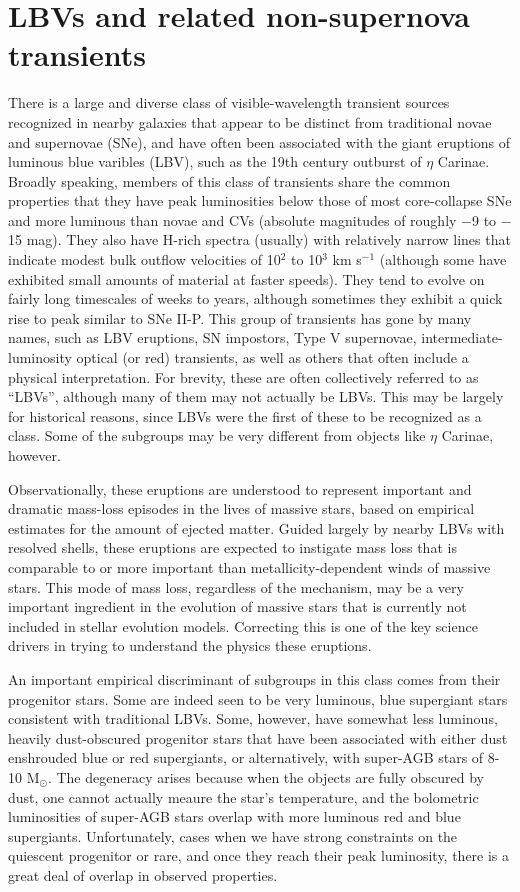 
\section{LBVs and related non-supernova transients}

There is a large and diverse class of visible-wavelength transient
sources recognized in nearby galaxies that appear to be distinct from
traditional novae and supernovae (SNe), and have often been associated with
the giant eruptions of luminous blue varibles (LBV), such as the 19th
century outburst of $\eta$ Carinae.  Broadly speaking, members of this
class of transients share the common properties that they have peak
luminosities below those of most core-collapse SNe and more luminous
than novae and CVs (absolute magnitudes of roughly $-$9 to $-$15 mag).
They also have H-rich spectra (usually) with relatively narrow lines
that indicate modest bulk outflow velocities of 10$^2$ to 10$^3$ km
s$^{-1}$ (although some have exhibited small amounts of material at
faster speeds).  They tend to evolve on fairly long timescales of
weeks to years, although sometimes they exhibit a quick rise to peak
similar to SNe II-P. This group of transients has gone by many names,
such as LBV eruptions, SN impostors, Type V supernovae,
intermediate-luminosity optical (or red) transients, as well as others
that often include a physical interpretation.  For brevity, these are
often collectively referred to as ``LBVs'', although many of them may
not actually be LBVs. This may be largely for historical reasons,
since LBVs were the first of these to be recognized as a class.  Some
of the subgroups may be very different from objects like $\eta$
Carinae, however.

Observationally, these eruptions are understood to represent important
and dramatic mass-loss episodes in the lives of massive stars, based
on empirical estimates for the amount of ejected matter.  Guided
largely by nearby LBVs with resolved shells, these eruptions are
expected to instigate mass loss that is comparable to or more
important than metallicity-dependent winds of massive stars.  This
mode of mass loss, regardless of the mechanism, may be a very
important ingredient in the evolution of massive stars that is
currently not included in stellar evolution models.  Correcting this
is one of the key science drivers in trying to understand the physics
these eruptions.

An important empirical discriminant of subgroups in this class comes
from their progenitor stars.  Some are indeed seen to be very
luminous, blue supergiant stars consistent with traditional LBVs.
Some, however, have somewhat less luminous, heavily dust-obscured
progenitor stars that have been associated with either dust enshrouded
blue or red supergiants, or alternatively, with super-AGB stars of
8-10 M$_{\odot}$.  The degeneracy arises because when the objects are
fully obscured by dust, one cannot actually meaure the star's
temperature, and the bolometric luminosities of super-AGB stars
overlap with more luminous red and blue supergiants.  Unfortunately,
cases when we have strong constraints on the quiescent progenitor or
rare, and once they reach their peak luminosity, there is a great deal
of overlap in observed properties.

